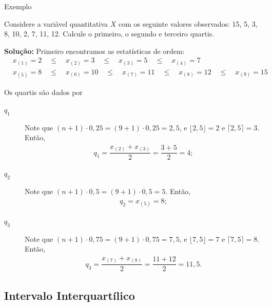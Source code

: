 \documentclass[8pt]{beamer}
\begin{document}
\begin{frame}{Exemplo}
 
  Considere a variável quantitativa $X$ com os seguinte valores observados: 15, 5, 3, 8, 10, 2, 7, 11, 12. Calcule o primeiro, o segundo e terceiro quartis.
  
  \textbf{Solução:} Primeiro encontramos as estatísticas de ordem:
  \begin{align*}
   &x_{(1)}  = 2 \quad \leq \quad x_{(2)}  = 3 \quad \leq \quad x_{(3)}  = 5 \quad \leq \quad x_{(4)}  = 7 \\
   &x_{(5)}  = 8 \quad \leq \quad x_{(6)}  = 10 \quad \leq \quad x_{(7)}  = 11 \quad \leq \quad x_{(8)}  = 12 \quad \leq \quad x_{(9)}  = 15
  \end{align*}
  
  Os quartis são dados por
  \begin{description}
   \item[$q_1$] Note que $(n+1)\cdot 0,25 = (9+1)\cdot 0,25 = 2,5$, e $\lfloor 2,5 \rfloor = 2$ e $\lceil 2,5 \rceil = 3$. Então,
   \begin{align*}
    q_1 = \dfrac{x_{(2)}+x_{(3)}}{2} = \dfrac{3+5}{2} = 4;
   \end{align*}

   \item[$q_2$] Note que $(n+1)\cdot 0,5 = (9+1)\cdot 0,5 = 5$. Então,
   \begin{align*}
    q_2 = x_{(5)} = 8;
   \end{align*}
   
   \item[$q_3$] Note que $(n+1)\cdot 0,75 = (9+1)\cdot 0,75 = 7,5$, e $\lfloor 7,5 \rfloor = 7$ e $\lceil 7,5 \rceil = 8$. Então,
   \begin{align*}
    q_3 = \dfrac{x_{(7)}+x_{(8)}}{2} = \dfrac{11+12}{2} = 11,5.
   \end{align*}
  \end{description}

\end{frame}

\subsection{Intervalo Interquartílico}
\end{document}
